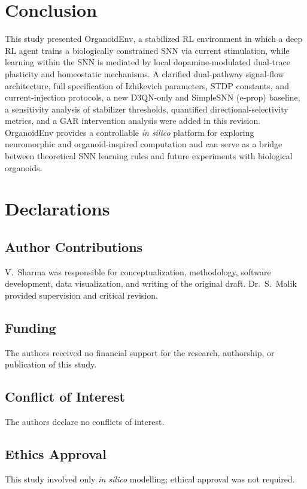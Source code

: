 \documentclass[journal,twocolumn]{IEEEtran}
\begin{document}
\section{Conclusion}

This study presented OrganoidEnv, a stabilized RL environment in which
a deep RL agent trains a biologically constrained SNN via current
stimulation, while learning within the SNN is mediated by local
dopamine-modulated dual-trace plasticity and homeostatic mechanisms.
A clarified dual-pathway signal-flow architecture, full specification
of Izhikevich parameters, STDP constants, and current-injection
protocols, a new D3QN-only and SimpleSNN (e-prop) baseline, a
sensitivity analysis of stabilizer thresholds, quantified
directional-selectivity metrics, and a GAR intervention analysis were
added in this revision.  OrganoidEnv provides a controllable
\emph{in silico} platform for exploring neuromorphic and
organoid-inspired computation and can serve as a bridge between
theoretical SNN learning rules and future experiments with biological
organoids.

\section*{Declarations}

\subsection*{Author Contributions}
V.~Sharma was responsible for conceptualization, methodology, software
development, data visualization, and writing of the original draft.
Dr.~S.~Malik provided supervision and critical revision.

\subsection*{Funding}
The authors received no financial support for the research, authorship,
or publication of this study.

\subsection*{Conflict of Interest}
The authors declare no conflicts of interest.

\subsection*{Ethics Approval}
This study involved only \emph{in silico} modelling; ethical approval
was not required.
\end{document}
